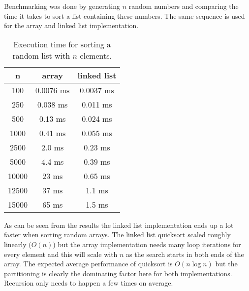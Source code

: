 \documentclass[a4paper,11pt]{article}
\begin{document}
Benchmarking was done by generating $n$ random numbers and comparing the time it takes to sort a list containing these numbers. The same sequence is used for the array and linked list implementation.

\begin{table}[H]
\centering
\begin{tabular}{|c|c|c|}
\hline
\textbf{n} & \textbf{array} & \textbf{linked list} \\
\hline
	100 & 0.0076 ms & 0.0037 ms  \\
	250 & 0.038 ms & 0.011 ms  \\
	500 & 0.13 ms & 0.024 ms  \\
	1000 & 0.41 ms & 0.055 ms  \\
	2500 & 2.0 ms & 0.23 ms  \\
	5000 & 4.4 ms & 0.39 ms  \\
	10000 & 23 ms & 0.65 ms  \\
	12500 & 37 ms & 1.1 ms  \\
	15000 & 65 ms & 1.5 ms  \\
\hline
\end{tabular}
\caption{Execution time for sorting a random list with $n$ elements.}
\label{tab:table1}
\end{table}

\begin{table}[H]
\centering
{}
\end{table}

As can be seen from the results the linked list implementation ends up a lot faster when sorting random arrays.
The linked list quicksort scaled roughly linearly ($O(n)$) but the array implementation needs many loop iterations for every element and this will scale with $n$ as the search starts in both ends of the array.
The expected average performance of quicksort is $O(n \log n)$ but the partitioning is clearly the dominating factor here for both implementations. Recursion only needs to happen a few times on average.
\end{document}
